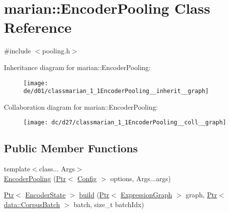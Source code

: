 \hypertarget{classmarian_1_1EncoderPooling}{}\section{marian\+:\+:Encoder\+Pooling Class Reference}
\label{classmarian_1_1EncoderPooling}


{\ttfamily \#include $<$pooling.\+h$>$}



Inheritance diagram for marian\+:\+:Encoder\+Pooling\+:
\nopagebreak
\begin{figure}[H]
\begin{center}
\leavevmode
\texttt{[image: de/d01/classmarian\_1\_1EncoderPooling\_\_inherit\_\_graph]}
\end{center}
\end{figure}


Collaboration diagram for marian\+:\+:Encoder\+Pooling\+:
\nopagebreak
\begin{figure}[H]
\begin{center}
\leavevmode
\texttt{[image: dc/d27/classmarian\_1\_1EncoderPooling\_\_coll\_\_graph]}
\end{center}
\end{figure}
\subsection*{Public Member Functions}
\begin{DoxyCompactItemize}
\item 
{\footnotesize template$<$class... Args$>$ }\\\hyperlink{classmarian_1_1EncoderPooling_a10b157a6d4cdcb521b2378877944404f}{Encoder\+Pooling} (\hyperlink{namespacemarian_ad1a373be43a00ef9ce35666145137b08}{Ptr}$<$ \hyperlink{classmarian_1_1Config}{Config} $>$ options, Args...\+args)
\item 
\hyperlink{namespacemarian_ad1a373be43a00ef9ce35666145137b08}{Ptr}$<$ \hyperlink{classmarian_1_1EncoderState}{Encoder\+State} $>$ \hyperlink{classmarian_1_1EncoderPooling_a676142ec672b7e9e84d8dc539039c57a}{build} (\hyperlink{namespacemarian_ad1a373be43a00ef9ce35666145137b08}{Ptr}$<$ \hyperlink{classmarian_1_1ExpressionGraph}{Expression\+Graph} $>$ graph, \hyperlink{namespacemarian_ad1a373be43a00ef9ce35666145137b08}{Ptr}$<$ \hyperlink{classmarian_1_1data_1_1CorpusBatch}{data\+::\+Corpus\+Batch} $>$ batch, size\+\_\+t batch\+Idx)
\end{DoxyCompactItemize}
